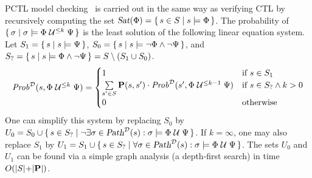 \documentclass{llncs}
\begin{document}
        PCTL model checking~\cite{HanssonJ_FAC94} is carried out in the same way
        as verifying CTL
        by recursively computing the set $\mbox{\sl Sat}(\Phi) = \{ \, s \in S \mid s \models \Phi \, \}$.
        The probability of $\{ \,  \sigma \mid \sigma \models \Phi \mathrel{\mathcal{U}^{\leq k}} \Psi \, \}$
        is the least solution of the following linear equation system.
        Let
        $S_1 = \{ \, s \mid s \models \Psi \, \}$,
        $S_0 = \{ \, s \mid s \models \neg \Phi \wedge \neg \Psi \, \}$,
        and $S_? = \{ \, s \mid s \models \Phi \wedge \neg \Psi \, \} = S \setminus (S_1 \cup S_0)$.
        \begin{equation*}\label{buntil}
                \mathit{Prob}^{\mathcal{D}}(s, \Phi \mathrel{\mathcal{U}^{\leq k}} \Psi) = \begin{cases}
                1       & \text{if } s \in S_1 \\
                \sum\limits_{s' \in S} \mathbf{P}(s,s') \cdot \mathit{Prob}^{\mathcal{D}}(s',\Phi \mathrel{\mathcal{U}^{\leq {k{-}1}}} \Psi)
                        & \text{if } s \in S_? \wedge k>0 \\
                0       & \text{otherwise} \end{cases}
        \end{equation*}
        One can simplify this system by replacing $S_0$ by
        $U_0 = S_0 \cup \{ \,  s \in S_? \mid \neg\exists \sigma \in \mbox{\sl Path}^{\mathcal{D}}(s): \sigma \models \Phi \mathrel{\mathcal{U}} \Psi \, \}$.
        If $k = \infty$, one may also replace $S_1$ by
        $U_1 = S_1 \cup \{ \,  s \in S_? \mid \forall \sigma \in \mbox{\sl Path}^{\mathcal{D}}(s): \sigma \models \Phi \mathrel{\mathcal{U}} \Psi \, \}$.
        The sets $U_0$ and $U_1$ can be found via a simple graph analysis (a depth-first search)
        in time $O(|S|{+}|\mathbf{P}|)$.
\end{document}
